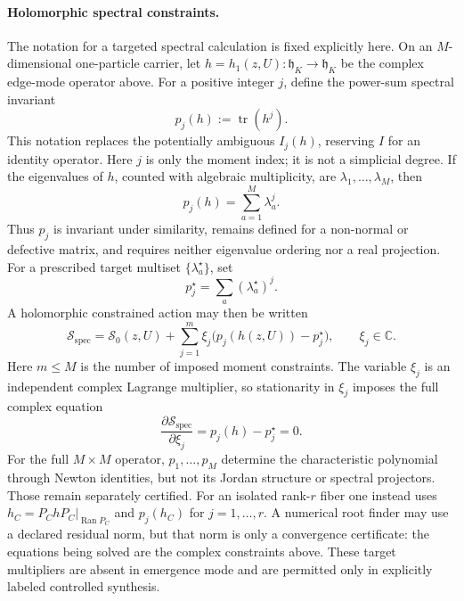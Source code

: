\documentclass[11pt,letterpaper]{article}
\newcommand{\hh}{\mathfrak{h}}
\begin{document}
\paragraph{Holomorphic spectral constraints.}
The notation for a targeted spectral calculation is fixed explicitly here.
On an $M$-dimensional one-particle carrier, let
$h=h_1(z,U):\hh_K\to\hh_K$ be the complex edge-mode operator above. For a
positive integer $j$, define the power-sum spectral invariant
\begin{equation*}
  p_j(h):=\operatorname{tr}(h^j).
\end{equation*}
This notation replaces the potentially ambiguous $I_j(h)$, reserving $I$ for
an identity operator.
Here $j$ is only the moment index; it is not a simplicial degree. If the
eigenvalues of $h$, counted with algebraic multiplicity, are
$\lambda_1,\ldots,\lambda_M$, then
\begin{equation*}
  p_j(h)=\sum_{a=1}^{M}\lambda_a^j.
\end{equation*}
Thus $p_j$ is invariant under similarity, remains defined for a non-normal or
defective matrix, and requires neither eigenvalue ordering nor a real
projection. For a prescribed target multiset
$\{\lambda_a^\star\}$, set
\begin{equation*}
  p_j^\star=\sum_a(\lambda_a^\star)^j .
\end{equation*}
A holomorphic constrained action may then be written
\begin{equation*}
  \mathcal S_{\mathrm{spec}}
  =\mathcal S_0(z,U)
   +\sum_{j=1}^{m}\xi_j\bigl(p_j(h(z,U))-p_j^\star\bigr),
  \qquad \xi_j\in\mathbb C .
\end{equation*}
Here $m\le M$ is the number of imposed moment constraints.
The variable $\xi_j$ is an independent complex Lagrange multiplier, so
stationarity in $\xi_j$ imposes the full complex equation
\begin{equation*}
  \frac{\partial\mathcal S_{\mathrm{spec}}}{\partial\xi_j}
  =p_j(h)-p_j^\star=0.
\end{equation*}
For the full $M\times M$ operator, $p_1,\ldots,p_M$ determine the
characteristic polynomial through Newton identities, but not its Jordan
structure or spectral projectors. Those remain separately certified. For an
isolated rank-$r$ fiber one instead uses
$h_C=P_ChP_C|_{\operatorname{Ran}P_C}$ and
$p_j(h_C)$ for $j=1,\ldots,r$. A numerical root finder may use a declared
residual norm, but that norm is only a convergence certificate: the equations
being solved are the complex constraints above. These target multipliers are
absent in emergence mode and are permitted only in explicitly labeled
controlled synthesis.
\end{document}
